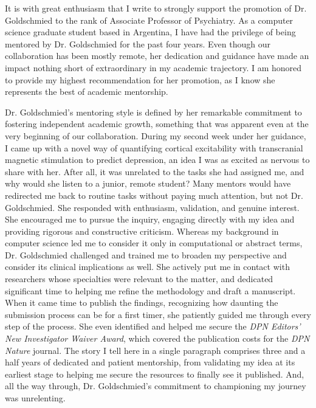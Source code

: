 \documentclass[a4paper, 12pt]{article}
\begin{document}
It is with great enthusiasm that I write to strongly support the promotion of
Dr. Goldschmied to the rank of Associate Professor of Psychiatry. As a computer
science graduate student based in Argentina, I have had the privilege of being
mentored by Dr. Goldschmied for the past four years. Even though our
collaboration has been mostly remote, her dedication and guidance have made an
impact nothing short of extraordinary in my academic trajectory. I am honored to
provide my highest recommendation for her promotion, as I know she represents
the best of academic mentorship.

Dr. Goldschmied's mentoring style is defined by her remarkable commitment to
fostering independent academic growth, something that was apparent even at the very
beginning of our collaboration. During my second week under her guidance, I came
up with a novel way of quantifying cortical excitability with transcranial
magnetic stimulation to predict depression, an idea I was as excited as
nervous to share with her. After all, it was unrelated to the tasks she had
assigned me, and why would she listen to a junior, remote student?
Many mentors would have redirected me back to routine tasks without
paying much attention, but not Dr. Goldschmied. She responded with enthusiasm,
validation, and genuine interest. She encouraged me to pursue the inquiry,
engaging directly with my idea and providing rigorous and constructive
criticism. Whereas my background in computer science led me to consider it
only in computational or abstract terms, Dr. Goldschmied challenged and trained
me to broaden my perspective and consider its clinical implications as well. She
actively put me in contact with researchers whose specialties were relevant to
the matter, and dedicated significant time to helping me refine the methodology
and draft a manuscript. When it came time to publish the findings,
recognizing how daunting the submission process can be for a first timer, she
patiently guided me through every step of the process. She even identified and
helped me secure the \textit{DPN Editors’ New Investigator Waiver Award}, which
covered the publication costs for the \textit{DPN Nature} journal. The story I
tell here in a single paragraph comprises three and a half years of dedicated
and patient mentorship, from validating my idea at its earliest stage to helping
me secure the resources to finally see it published. And, all the way through,
Dr. Goldschmied's commitment to championing my journey was unrelenting.
\end{document}
